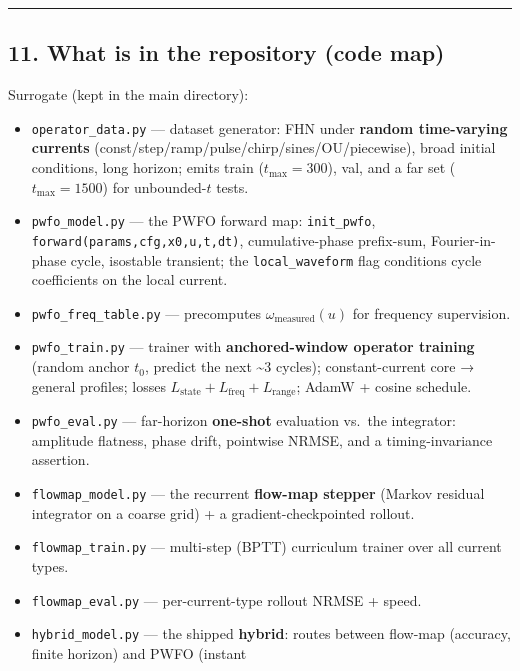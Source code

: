 \documentclass[
  11pt,
]{article}
\providecommand{\tightlist}{%
  \setlength{\itemsep}{0pt}\setlength{\parskip}{0pt}}
\begin{document}
\begin{center}\rule{0.5\linewidth}{0.5pt}\end{center}

\subsection{11. What is in the repository (code
map)}\label{what-is-in-the-repository-code-map}

Surrogate (kept in the main directory):

\begin{itemize}
\tightlist
\item
  \texttt{operator\_data.py} --- dataset generator: FHN under
  \textbf{random time-varying currents}
  (const/step/ramp/pulse/chirp/sines/OU/piecewise), broad initial
  conditions, long horizon; emits train (\(t_{\max}=300\)), val, and a
  far set (\(t_{\max}=1500\)) for unbounded-\(t\) tests.
\item
  \texttt{pwfo\_model.py} --- the PWFO forward map: \texttt{init\_pwfo},
  \texttt{forward(params,cfg,x0,u,t,dt)}, cumulative-phase prefix-sum,
  Fourier-in-phase cycle, isostable transient; the
  \texttt{local\_waveform} flag conditions cycle coefficients on the
  local current.
\item
  \texttt{pwfo\_freq\_table.py} --- precomputes
  \(\omega_{\text{measured}}(u)\) for frequency supervision.
\item
  \texttt{pwfo\_train.py} --- trainer with \textbf{anchored-window
  operator training} (random anchor \(t_0\), predict the next
  \textasciitilde3 cycles); constant-current core → general profiles;
  losses \(L_{\text{state}}+L_{\text{freq}}+L_{\text{range}}\); AdamW +
  cosine schedule.
\item
  \texttt{pwfo\_eval.py} --- far-horizon \textbf{one-shot} evaluation
  vs.~the integrator: amplitude flatness, phase drift, pointwise NRMSE,
  and a timing-invariance assertion.
\item
  \texttt{flowmap\_model.py} --- the recurrent \textbf{flow-map stepper}
  (Markov residual integrator on a coarse grid) + a
  gradient-checkpointed rollout.
\item
  \texttt{flowmap\_train.py} --- multi-step (BPTT) curriculum trainer
  over all current types.
\item
  \texttt{flowmap\_eval.py} --- per-current-type rollout NRMSE + speed.
\item
  \texttt{hybrid\_model.py} --- the shipped \textbf{hybrid}: routes
  between flow-map (accuracy, finite horizon) and PWFO (instant

\end{itemize}
\end{document}
